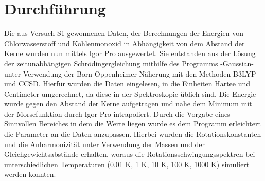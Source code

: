 
 
%
\section{Durchführung}
Die aus Versuch S1 gewonnenen Daten, der Berechnungen der Energien von Chlorwasserstoff und Kohlenmonoxid in Abhängigkeit von dem Abstand der Kerne wurden nun mittels Igor Pro ausgewertet. Sie entstanden aus der Lösung der zeitunabhängigen Schrödingergleichung mithilfe des Programms -Gaussian- unter Verwendung der Born-Oppenheimer-Näherung mit den Methoden B3LYP und CCSD. 
Hierfür wurden die Daten eingelesen, in die Einheiten Hartee und Centimeter umgerechnet, da diese in der Spektroskopie üblich sind. Die Energie wurde gegen den Abstand der Kerne aufgetragen und nahe dem Minimum mit der Morsefunktion durch Igor Pro intrapoliert. Durch die Vorgabe eines Sinnvollen Bereiches in dem die Werte liegen wurde es dem Programm erleichtert die Parameter an die Daten anzupassen.
Hierbei wurden die Rotationskonstanten und die Anharmonizität unter Verwendung der Massen und der Gleichgewichtsabstände erhalten, woraus die Rotationsschwingungsspektren bei unterschiedlichen Temperaturen (0.01 K, 1 K, 10 K, 100 K, 1000 K) simuliert werden konnten. 
%